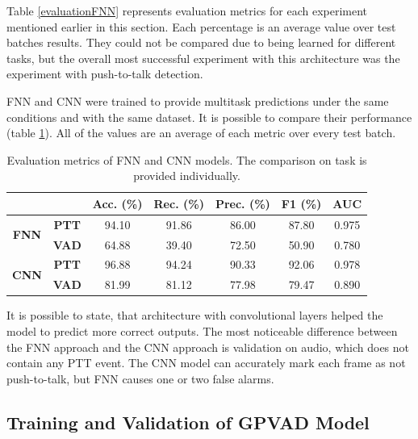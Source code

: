     Table \ref{evaluationFNN} represents evaluation metrics for each experiment mentioned earlier in this section. Each percentage is an average value over test batches results. They could not be compared due to being learned for different tasks, but the overall most successful experiment with this architecture was the experiment with push-to-talk detection. 
    

    FNN and CNN were trained to provide multitask predictions under the same conditions and with the same dataset.
    It is possible to compare their performance (table \ref{comparisonFNNCNN}). All of the values are an average of each metric over every test batch. 

    \begin{table}[!h]  
    \begin{center}
    \begin{tabular}{|c|c|c|c|c|c|c|}\hline 
        \multicolumn{2}{|c|}{} & \textbf{Acc. (\%)}  & \textbf{Rec. (\%)} & \textbf{Prec. (\%)} & \textbf{F1 (\%)} & \textbf{AUC} \\ \hline
        \multirow{2}{*}{\textbf{FNN}} & \textbf{PTT} & 94.10 & 91.86 & 86.00 & 87.80 & 0.975\\ \cline{2-7}
        & \textbf{VAD} & 64.88 & 39.40 & 72.50 & 50.90 & 0.780\\ \hline
        \multirow{2}{*}{\textbf{CNN}} & \textbf{PTT} & 96.88 & 94.24 & 90.33 & 92.06 & 0.978\\ \cline{2-7}
        & \textbf{VAD} & 81.99 & 81.12 & 77.98 & 79.47 & 0.890\\ \hline
    \end{tabular}
    \caption{Evaluation metrics of FNN and CNN models. The comparison on task is provided individually.}
    \label{comparisonFNNCNN}
    \end{center}
    \end{table}

    It is possible to state, that architecture with convolutional layers helped the model to predict more correct outputs. The most noticeable difference between the FNN approach and the CNN approach is validation on audio, which does not contain any PTT event. The CNN model can accurately mark each frame as not push-to-talk, but FNN causes one or two false alarms. 


    \newpage
    
    \subsection{Training and Validation of GPVAD Model}\label{TVGM}

